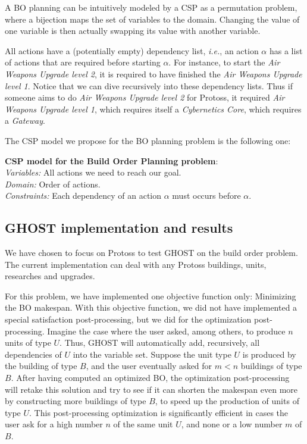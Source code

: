 \documentclass[journal]{IEEEtran}
\newcommand{\csp}{\textsc{CSP}\xspace}
\newcommand{\ghost}{\textsc{GHOST}\xspace}
\newcommand{\ie}{\textit{i.e.}}
\newcommand{\modelcsp}[4]%
{ \begin{trivlist}
  \item[]%
    \textbf{CSP model for #1}:\\
    \textit{Variables:} #2\\
    \textit{Domain:} #3\\
    \textit{Constraints:} #4
  \end{trivlist}%
}
\begin{document}
A  BO  planning can  be intuitively  modeled by  a \csp  as a
permutation problem,  where a bijection  maps the set of  variables to
the  domain. Changing  the  value  of one  variable  is then  actually
swapping its value with another variable.

All actions have a (potentially empty) dependency list, \ie, an action
$\alpha$  has a  list of  actions  that are  required before  starting
$\alpha$.   For instance,  to  start the  \textit{Air Weapons  Upgrade
  level 2},  it is required  to have finished the  \textit{Air Weapons
  Upgrade level  1}. Notice  that we can  dive recursively  into these
dependency  lists.  Thus  if someone  aims to  do \textit{Air  Weapons
  Upgrade  level  2}  for  Protoss, it  required  \textit{Air  Weapons
  Upgrade level 1}, which requires itself a \textit{Cybernetics Core},
which requires a \textit{Gateway}.

The \csp model we propose for  the BO planning problem is the
following one:
\modelcsp{the Build Order Planning problem}%
{All actions we need to reach our goal.}%
{Order of actions.}%
{Each dependency of an action $\alpha$ must occurs before $\alpha$.}

\subsection{\ghost implementation and results}

We have chosen to  focus on Protoss to test \ghost  on the build order
problem.   The  current  implementation  can  deal  with  any  Protoss
buildings, units, researches and upgrades.

For this  problem, we  have implemented  one objective  function only:
Minimizing the BO makespan.  With  this objective function, we did not
have implemented  a special  satisfaction post-processing, but  we did
for the optimization post-processing. Imagine  the case where the user
asked, among  others, to produce $n$  units of type $U$.  Thus, \ghost
will automatically add, recursively, all  dependencies of $U$ into the
variable set.  Suppose  the unit type $U$ is produced  by the building
of type $B$,  and the user eventually  asked for $m <  n$ buildings of
type $B$.   After having  computed an  optimized BO,  the optimization
post-processing will  retake this solution  and try  to see if  it can
shorten the makespan even more  by constructing more buildings of type
$B$,  to  speed  up  the  production  of  units  of  type  $U$.   This
post-processing optimization  is significantly efficient in  cases the
user ask for a high number $n$ of the same unit $U$, and none or a low
number $m$ of $B$.
\end{document}
